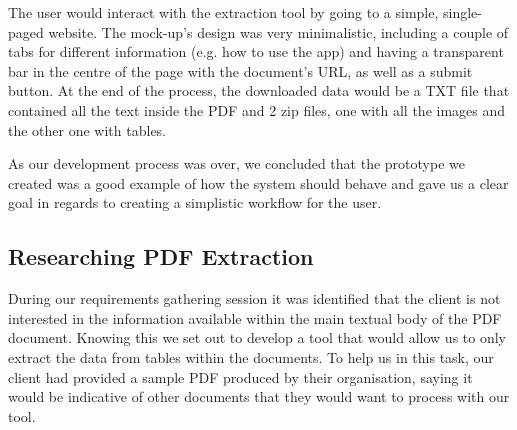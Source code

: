\documentclass{l3proj}
\begin{document}
The user would interact with the extraction tool by going to a simple, single-paged website. The mock-up's design was very minimalistic, including a couple of tabs for different information (e.g. how to use the app) and having a transparent bar in the centre of the page with the document's URL, as well as a submit button. At the end of the process, the downloaded data would be a TXT file that contained all the text inside the PDF and 2 zip files, one with all the images and the other one with tables.

As our development process was over, we concluded that the prototype we created was a good example of how the system should behave and gave us a clear goal in regards to creating a simplistic workflow for the user.

\subsection{Researching PDF Extraction} 
\label{sec:research_pdf}
During our requirements gathering session it was identified that the client is not interested in the information available within the main textual body of the PDF document. Knowing this we set out to develop a tool that would allow us to only extract the data from tables within the documents. To help us in this task, our client had provided a sample PDF produced by their organisation, saying it would be indicative of other documents that they would want to process with our tool.
\end{document}

